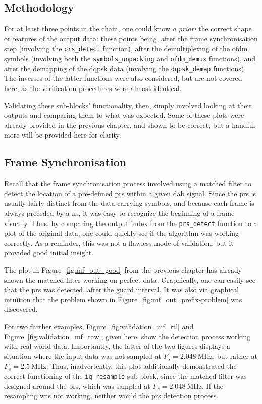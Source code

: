 \documentclass[class=report,11pt,crop=false]{standalone}
\begin{document}
\subsection{Methodology}
For at least three points in the chain, one could know \emph{a priori} the correct shape or features of the output data: these points being, after the frame synchronisation step (involving the \texttt{prs\_detect} function), after the demultiplexing of the \gls{ofdm} symbols (involving both the \texttt{symbols\_unpacking} and \texttt{ofdm\_demux} functions), and after the demapping of the \gls{dqpsk} data (involving the \texttt{dqpsk\_demap} functions). The inverses of the latter functions were also considered, but are not covered here, as the verification procedures were almost identical.

Validating these sub-blocks' functionality, then, simply involved looking at their outputs and comparing them to what was expected. Some of these plots were already provided in the previous chapter, and shown to be correct, but a handful more will be provided here for clarity.

\subsection{Frame Synchronisation}
Recall that the frame synchronisation process involved using a matched filter to detect the location of a pre-defined \gls{prs} within a given \gls{dab} signal. Since the \gls{prs} is usually fairly distinct from the data-carrying symbols, and because each frame is always preceded by a \gls{ns}, it was easy to recognize the beginning of a frame visually. Thus, by comparing the output index from the \texttt{prs\_detect} function to a plot of the original data, one could quickly see if the algorithm was working correctly. As a reminder, this was not a flawless mode of validation, but it provided good initial insight.

The plot in Figure~\ref{fig:mf_out_good} from the previous chapter has already shown the matched filter working on perfect data. Graphically, one can easily see that the \gls{prs} was detected, after the guard interval. It was also via graphical intuition that the problem shown in Figure~\ref{fig:mf_out_prefix-problem} was discovered.

For two further examples, Figure~\ref{fig:validation_mf_rtl} and Figure~\ref{fig:validation_mf_raw}, given here, show the detection process working with real-world data. Importantly, the latter of the two figures displays a situation where the input data was not sampled at \(F_s = \SI{2.048}{\mega\hertz}\), but rather at \(F_s = \SI{2.5}{\mega\hertz}\). Thus, inadvertently, this plot additionally demonstrated the correct functioning of the \texttt{iq\_resample} sub-block, since the matched filter was designed around the \gls{prs}, which was sampled at \(F_s = \SI{2.048}{\mega\hertz}\). If the resampling was not working, neither would the \gls{prs} detection process.
\end{document}
